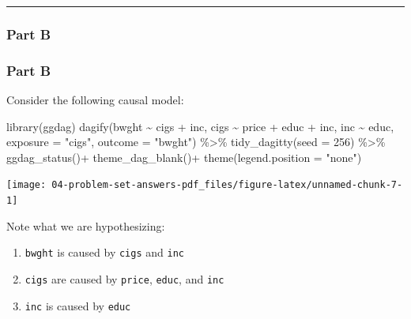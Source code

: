 \documentclass[
]{article}
\newenvironment{Shaded}{\begin{snugshade}}{\end{snugshade}}
\newcommand{\AttributeTok}[1]{\textcolor[rgb]{0.77,0.63,0.00}{#1}}
\newcommand{\DecValTok}[1]{\textcolor[rgb]{0.00,0.00,0.81}{#1}}
\newcommand{\FunctionTok}[1]{\textcolor[rgb]{0.00,0.00,0.00}{#1}}
\newcommand{\NormalTok}[1]{#1}
\newcommand{\SpecialCharTok}[1]{\textcolor[rgb]{0.00,0.00,0.00}{#1}}
\newcommand{\StringTok}[1]{\textcolor[rgb]{0.31,0.60,0.02}{#1}}
\providecommand{\tightlist}{%
  \setlength{\itemsep}{0pt}\setlength{\parskip}{0pt}}
\begin{document}
\begin{center}\rule{0.5\linewidth}{0.5pt}\end{center}

\hypertarget{part-b-2}{%
\subsubsection{Part B}\label{part-b-2}}

\hypertarget{part-b-3}{%
\subsubsection{Part B}\label{part-b-3}}

Consider the following causal model:

\begin{Shaded}
\begin{Highlighting}[]
\FunctionTok{library}\NormalTok{(ggdag)}
\FunctionTok{dagify}\NormalTok{(bwght }\SpecialCharTok{\textasciitilde{}}\NormalTok{ cigs }\SpecialCharTok{+}\NormalTok{ inc,}
\NormalTok{       cigs }\SpecialCharTok{\textasciitilde{}}\NormalTok{ price }\SpecialCharTok{+}\NormalTok{ educ }\SpecialCharTok{+}\NormalTok{ inc,}
\NormalTok{       inc }\SpecialCharTok{\textasciitilde{}}\NormalTok{ educ,}
       \AttributeTok{exposure =} \StringTok{"cigs"}\NormalTok{,}
       \AttributeTok{outcome =} \StringTok{"bwght"}\NormalTok{) }\SpecialCharTok{\%\textgreater{}\%}
  \FunctionTok{tidy\_dagitty}\NormalTok{(}\AttributeTok{seed =} \DecValTok{256}\NormalTok{) }\SpecialCharTok{\%\textgreater{}\%}
  \FunctionTok{ggdag\_status}\NormalTok{()}\SpecialCharTok{+}
  \FunctionTok{theme\_dag\_blank}\NormalTok{()}\SpecialCharTok{+}
  \FunctionTok{theme}\NormalTok{(}\AttributeTok{legend.position =} \StringTok{"none"}\NormalTok{)}
\end{Highlighting}
\end{Shaded}

\texttt{[image: 04-problem-set-answers-pdf\_files/figure-latex/unnamed-chunk-7-1]}

Note what we are hypothesizing:

\begin{enumerate}
\def\labelenumi{\arabic{enumi}.}
\tightlist
\item
  \texttt{bwght} is caused by \texttt{cigs} and \texttt{inc}
\item
  \texttt{cigs} are caused by \texttt{price}, \texttt{educ}, and
  \texttt{inc}
\item
  \texttt{inc} is caused by \texttt{educ}
\end{enumerate}
\end{document}
